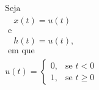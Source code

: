 \documentclass[preview]{standalone}
\begin{document}
\begin{align*}
\text{Seja } \\ \quad{x(t)} = u(t) \\ \text{ e }  \\ \quad h(t) = u(t),\\ \text{ em que } \\ u(t) = \begin{cases} 0, & \text{se } t < 0 \\ 1, & \text{se } t \geq 0 \end{cases}
\end{align*}
\end{document}
